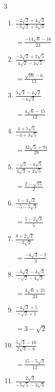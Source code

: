 \begin{multicols}{3}
\begin{enumerate}
  \item $\displaystyle \frac{-2\sqrt{2}+4\sqrt{3}}{-5\sqrt{2}+3\sqrt{3}}$

        $\displaystyle =\frac{-14\sqrt{6}-16}{23}$

  \item $\displaystyle \frac{-3\sqrt{2}+2\sqrt{5}}{4\sqrt{2}-3\sqrt{5}}$

        $\displaystyle =\frac{\sqrt{10}-6}{13}$

  \item $\displaystyle \frac{5\sqrt{3}-4\sqrt{2}}{-4\sqrt{3}}$

        $\displaystyle =\frac{4\sqrt{6}-15}{12}$

  \item $\displaystyle \frac{4+5\sqrt{5}}{-4+3\sqrt{5}}$

        $\displaystyle =\frac{32\sqrt{5}+91}{29}$

  \item $\displaystyle \frac{-\sqrt{3}-4\sqrt{5}}{4\sqrt{3}+2\sqrt{5}}$

        $\displaystyle =\frac{2-\sqrt{15}}{2}$

\columnbreak %

\resetques

  \item $\displaystyle \frac{1-3\sqrt{3}}{-5-5\sqrt{3}}$

        $\displaystyle =\frac{5-2\sqrt{3}}{5}$

  \item $\displaystyle \frac{8+2\sqrt{2}}{-3\sqrt{2}}$

        $\displaystyle =\frac{-4\sqrt{2}-2}{3}$

  \item $\displaystyle \frac{-3\sqrt{2}-4\sqrt{3}}{-\sqrt{2}-4\sqrt{3}}$

        $\displaystyle =\frac{4\sqrt{6}+21}{23}$

  \item $\displaystyle \frac{-4\sqrt{2}+5}{-\sqrt{2}+1}$

        $\displaystyle =3-\sqrt{2}$

  \item $\displaystyle \frac{5\sqrt{3}-10}{2\sqrt{3}-6}$

        $\displaystyle =\frac{15-5\sqrt{3}}{12}$

\columnbreak %

  \item $\displaystyle \frac{2\sqrt{3}}{-5\sqrt{5}-3\sqrt{3}}$


\end{enumerate}
\end{multicols}

